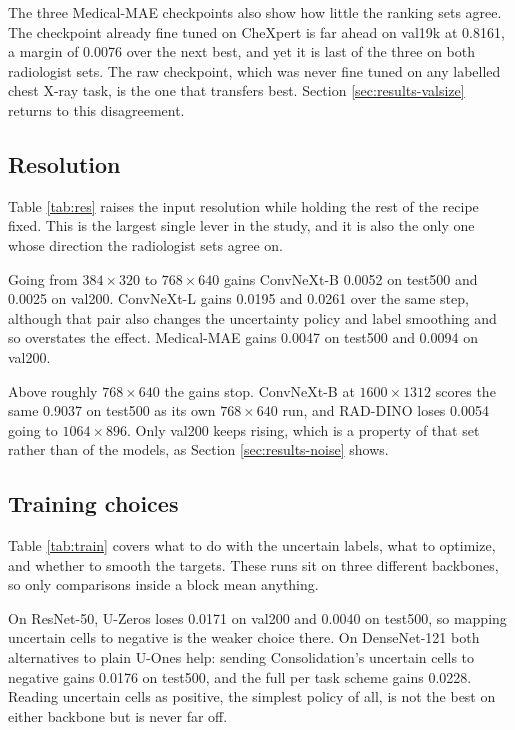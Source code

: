 \documentclass{article}
\begin{document}
The three Medical-MAE checkpoints also show how little the ranking sets agree. The
checkpoint already fine tuned on CheXpert is far ahead on val19k at 0.8161, a margin of
0.0076 over the next best, and yet it is last of the three on both radiologist sets. The
raw checkpoint, which was never fine tuned on any labelled chest X-ray task, is the one
that transfers best. Section \ref{sec:results-valsize} returns to this disagreement.



\subsection{Resolution}
\label{sec:results-res}

Table \ref{tab:res} raises the input resolution while holding the rest of the recipe
fixed. This is the largest single lever in the study, and it is also the only one whose
direction the radiologist sets agree on.

Going from $384\times320$ to $768\times640$ gains ConvNeXt-B 0.0052 on test500 and
0.0025 on val200. ConvNeXt-L gains 0.0195 and 0.0261 over the same step, although that
pair also changes the uncertainty policy and label smoothing and so overstates the
effect. Medical-MAE gains 0.0047 on test500 and 0.0094 on val200.

Above roughly $768\times640$ the gains stop. ConvNeXt-B at $1600\times1312$ scores the
same 0.9037 on test500 as its own $768\times640$ run, and RAD-DINO loses 0.0054 going
to $1064\times896$. Only val200 keeps rising, which is a property of that set rather
than of the models, as Section \ref{sec:results-noise} shows.



\subsection{Training choices}
\label{sec:results-uncertain}

Table \ref{tab:train} covers what to do with the uncertain labels, what to optimize,
and whether to smooth the targets. These runs sit on three different backbones, so
only comparisons inside a block mean anything.

On ResNet-50, U-Zeros loses 0.0171 on val200 and 0.0040 on test500, so mapping uncertain
cells to negative is the weaker choice there. On DenseNet-121 both alternatives to plain
U-Ones help: sending Consolidation's uncertain cells to negative gains 0.0176 on test500,
and the full per task scheme gains 0.0228. Reading uncertain cells as positive, the
simplest policy of all, is not the best on either backbone but is never far off.
\end{document}
